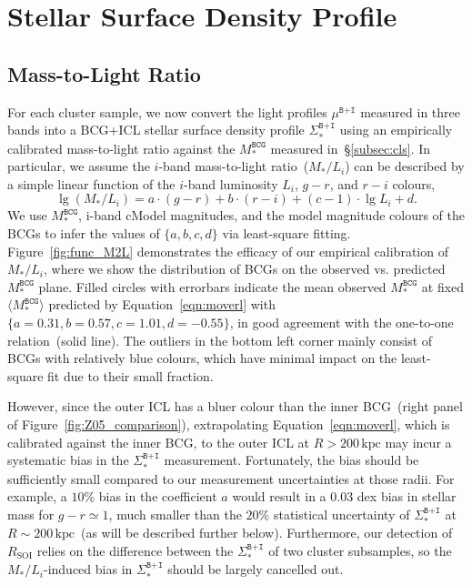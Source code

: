 \documentclass[fleqn,usenatbib]{mnras}
\newcommand{\rsoi}{R_{\mathrm{SOI}}}
\newcommand{\sigbi}{\Sigma_*^{\texttt{B+I}}}
\newcommand{\mubi}{\mu^{\texttt{B+I}}}
\newcommand{\msbcg}{M_*^{\texttt{BCG}}}
\newcommand{\kpc}{\mathrm{kpc}}
\begin{document}
\section{Stellar Surface Density Profile}
\label{sec:sigma}

\subsection{Mass-to-Light Ratio}
\label{subsec:moverl}



For each cluster sample, we now convert the light profiles $\mubi$ measured
in three bands into a BCG+ICL stellar surface density profile $\sigbi$
using an empirically calibrated mass-to-light ratio against the $\msbcg$
measured in~\S\ref{subsec:cls}.  In particular, we assume the $i$-band
mass-to-light ratio~($M_*/L_i$) can be described by a simple linear
function of the $i$-band luminosity $L_i$, $g{-}r$, and $r{-}i$ colours,
\begin{equation}
    \lg(M_{\ast}/L_{i}) = a \cdot (g-r) + b \cdot (r-i) + (c - 1) \cdot \lg L_{i} + d.
    \label{eqn:moverl}
\end{equation}
We use $\msbcg$, i-band cModel magnitudes, and the model magnitude colours
of the BCGs to infer the values of $\{a, b, c, d\}$ via least-square
fitting. Figure~\ref{fig:func_M2L} demonstrates the efficacy of our
empirical calibration of $M_*/L_i$, where we show the distribution of BCGs
on the observed vs. predicted $\msbcg$ plane. Filled circles with errorbars
indicate the mean observed $\msbcg$ at fixed $\langle\msbcg\rangle$
predicted by Equation~\ref{eqn:moverl} with $\{a{=}0.31, b{=}0.57,
c{=}1.01, d{=}{-}0.55\}$, in good agreement with the one-to-one
relation~(solid line). The outliers in the bottom left corner mainly
consist of BCGs with relatively blue colours, which have minimal impact on
the least-square fit due to their small fraction.


However, since the outer ICL has a bluer colour than the inner BCG~(right
panel of Figure~\ref{fig:Z05_comparison}), extrapolating
Equation~\ref{eqn:moverl}, which is calibrated against the inner BCG, to
the outer ICL at $R{>}200\,\kpc$ may incur a systematic bias in the
$\sigbi$ measurement.  Fortunately, the bias should be sufficiently small
compared to our measurement uncertainties at those radii. For example, a
$10\%$ bias in the coefficient $a$ would result in a $0.03$ dex bias in
stellar mass for $g{-}r{\simeq}1$, much smaller than the $20\%$ statistical
uncertainty of $\sigbi$ at $R{\sim}200\,\kpc$~(as will be described further
below). Furthermore, our detection of $\rsoi$ relies on the difference
between the $\sigbi$ of two cluster subsamples, so the $M_*/L_i$-induced
bias in $\sigbi$ should be largely cancelled out.
\end{document}
